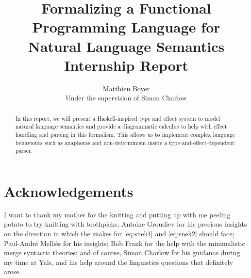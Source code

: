 \documentclass[math, english, info]{tcart}
\title{Formalizing a Functional Programming Language for Natural Language Semantics\\[-.5ex] {\small Internship Report}}
\author{Matthieu Boyer \\ {\small Under the supervision of Simon Charlow}}
\begin{document}
\maketitle

\begin{abstract}
	In this report, we will present a Haskell-inspired type and effect system to
	model natural language semantics and provide a diagrammatic calculus to help
	with effect handling and parsing in this formalism.
	This allows us to implement complex language behaviours such as anaphoras and
	non-determinism inside a type-and-effect-dependent parser.
\end{abstract}

\section*{Acknowledgements}
I want to thank my mother for the knitting and putting up
with me peeling potato to try knitting with toothpicks; Antoine Groudiev for
his precious insights on the direction in which the snakes for
\eqref{eq:snek1} and \eqref{eq:snek2} should face;
Paul-André Melliès for his insights; Bob Frank for the help with the
minimalistic merge syntactic theories; and of course, Simon Charlow for his
guidance during my time at Yale, and his help around the linguistics questions
that definitely arose.













\clearpage
\appendix



\end{document}
